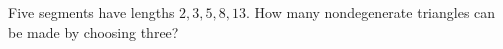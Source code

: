 Five segments have lengths $2,3,5,8,13$. How many nondegenerate triangles can be made by choosing three?
